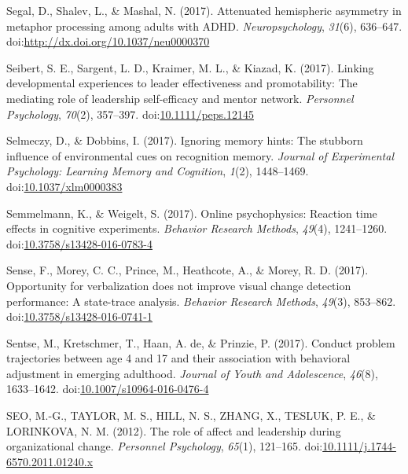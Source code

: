 \documentclass[english,man]{apa6}
\theoremstyle{definition}
\theoremstyle{definition}
\theoremstyle{definition}
\theoremstyle{remark}
\begin{document}
\hypertarget{ref-Segal2017}{}
Segal, D., Shalev, L., \& Mashal, N. (2017). Attenuated hemispheric
asymmetry in metaphor processing among adults with ADHD.
\emph{Neuropsychology}, \emph{31}(6), 636--647.
doi:\href{https://doi.org/http://dx.doi.org/10.1037/neu0000370}{http://dx.doi.org/10.1037/neu0000370}

\hypertarget{ref-Seibert2017}{}
Seibert, S. E., Sargent, L. D., Kraimer, M. L., \& Kiazad, K. (2017).
Linking developmental experiences to leader effectiveness and
promotability: The mediating role of leadership self-efficacy and mentor
network. \emph{Personnel Psychology}, \emph{70}(2), 357--397.
doi:\href{https://doi.org/10.1111/peps.12145}{10.1111/peps.12145}

\hypertarget{ref-Selmeczy2017}{}
Selmeczy, D., \& Dobbins, I. (2017). Ignoring memory hints: The stubborn
influence of environmental cues on recognition memory. \emph{Journal of
Experimental Psychology: Learning Memory and Cognition}, \emph{1}(2),
1448--1469.
doi:\href{https://doi.org/10.1037/xlm0000383}{10.1037/xlm0000383}

\hypertarget{ref-Semmelmann2017}{}
Semmelmann, K., \& Weigelt, S. (2017). Online psychophysics: Reaction
time effects in cognitive experiments. \emph{Behavior Research Methods},
\emph{49}(4), 1241--1260.
doi:\href{https://doi.org/10.3758/s13428-016-0783-4}{10.3758/s13428-016-0783-4}

\hypertarget{ref-Sense2013}{}
Sense, F., Morey, C. C., Prince, M., Heathcote, A., \& Morey, R. D.
(2017). Opportunity for verbalization does not improve visual change
detection performance: A state-trace analysis. \emph{Behavior Research
Methods}, \emph{49}(3), 853--862.
doi:\href{https://doi.org/10.3758/s13428-016-0741-1}{10.3758/s13428-016-0741-1}

\hypertarget{ref-Sentse2017}{}
Sentse, M., Kretschmer, T., Haan, A. de, \& Prinzie, P. (2017). Conduct
problem trajectories between age 4 and 17 and their association with
behavioral adjustment in emerging adulthood. \emph{Journal of Youth and
Adolescence}, \emph{46}(8), 1633--1642.
doi:\href{https://doi.org/10.1007/s10964-016-0476-4}{10.1007/s10964-016-0476-4}

\hypertarget{ref-Seo2012}{}
SEO, M.-G., TAYLOR, M. S., HILL, N. S., ZHANG, X., TESLUK, P. E., \&
LORINKOVA, N. M. (2012). The role of affect and leadership during
organizational change. \emph{Personnel Psychology}, \emph{65}(1),
121--165.
doi:\href{https://doi.org/10.1111/j.1744-6570.2011.01240.x}{10.1111/j.1744-6570.2011.01240.x}
\end{document}
